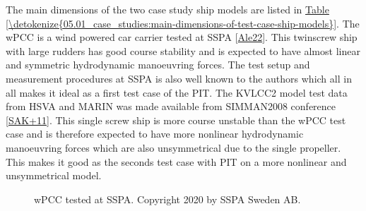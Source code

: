 \documentclass[review]{elsarticle}
\let\sphinxpxdimen\pdfpxdimen\else\newdimen\sphinxpxdimen
\begin{document}
\sphinxAtStartPar
The main dimensions of the two case study ship models are listed in \hyperref[\detokenize{05.01_case_studies:main-dimensions-of-test-case-ship-models}]{Table \ref{\detokenize{05.01_case_studies:main-dimensions-of-test-case-ship-models}}}. The wPCC is a wind powered car carrier tested at SSPA {[}\hyperlink{cite.bibligraphy:id86}{Ale22}{]}. This twin\sphinxhyphen{}screw ship with large rudders has good course stability and is expected to have almost linear and symmetric hydrodynamic manoeuvring forces. The test setup and measurement procedures at SSPA is also well known to the authors which all in all makes it ideal as a first test case of the PIT.
The KVLCC2 model test data from HSVA and MARIN was made available from SIMMAN2008 conference {[}\hyperlink{cite.bibligraphy:id79}{SAK+11}{]}. This single screw ship is more course unstable than the wPCC test case and is therefore expected to have more nonlinear hydrodynamic manoeuvring forces which are also unsymmetrical due to the single propeller. This makes it good as the seconds test case with PIT on a more nonlinear and unsymmetrical model.

\begin{figure}[H]
\centering
\capstart

\noindent\sphinxincludegraphics[height=150\sphinxpxdimen]{{wpcc_mdl}.png}
\caption{wPCC tested at SSPA. Copyright 2020 by SSPA Sweden AB.}\label{\detokenize{05.01_case_studies:wpcc-mdl}}\end{figure}
\end{document}
